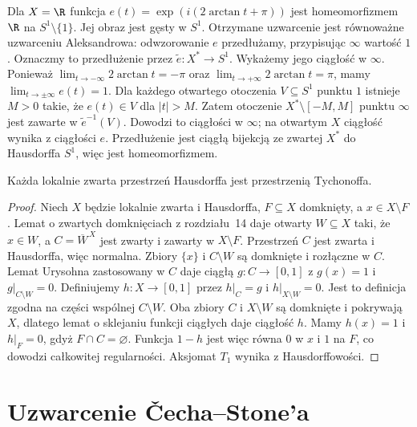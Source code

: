 \begin{przyklad}
\label{ex:topog-uzwarcenia-aleksandrow-prosta}
Dla $X=\R$ funkcja
$e(t)=\exp(i(2\arctan t+\pi))$
jest homeomorfizmem $\R$
na $S^1\setminus\{1\}$.
Jej obraz jest gęsty w $S^1$.
Otrzymane uzwarcenie jest
równoważne uzwarceniu Aleksandrowa:
odwzorowanie $e$ przedłużamy,
przypisując $\infty$ wartość $1$.
Oznaczmy to przedłużenie przez
$\widetilde e\colon X^\ast\to S^1$.
Wykażemy jego ciągłość w $\infty$.
Ponieważ
$\lim_{t\to-\infty}2\arctan t=-\pi$
oraz
$\lim_{t\to+\infty}2\arctan t=\pi$,
mamy
$\lim_{t\to\pm\infty}e(t)=1$.
Dla każdego otwartego otoczenia
$V\subseteq S^1$ punktu $1$
istnieje $M>0$ takie, że
$e(t)\in V$ dla $|t|>M$.
Zatem otoczenie
$X^\ast\setminus[-M,M]$ punktu
$\infty$ jest zawarte w
$\widetilde e^{-1}(V)$.
Dowodzi to ciągłości w $\infty$;
na otwartym $X$ ciągłość
wynika z ciągłości $e$.
Przedłużenie jest ciągłą bijekcją
ze zwartej $X^\ast$ do Hausdorffa $S^1$,
więc jest homeomorfizmem.
\end{przyklad}

\begin{lemat}
\label{lem:topog-uzwarcenia-lokalna-tych}
Każda lokalnie zwarta przestrzeń
Hausdorffa jest przestrzenią Tychonoffa.
\end{lemat}
\begin{proof}
Niech $X$ będzie lokalnie zwarta
i Hausdorffa, $F\subseteq X$ domknięty,
a $x\in X\setminus F$.
Lemat o zwartych domknięciach
z rozdziału~14 daje otwarty
$W\subseteq X$ taki, że
$x\in W$, a
$C=\overline W^{\,X}$ jest zwarty
i zawarty w $X\setminus F$.
Przestrzeń $C$ jest zwarta i Hausdorffa,
więc normalna.
Zbiory $\{x\}$ i $C\setminus W$
są domknięte i rozłączne w $C$.
Lemat Urysohna zastosowany w $C$
daje ciągłą $g\colon C\to[0,1]$
z $g(x)=1$ i $g|_{C\setminus W}=0$.
Definiujemy $h\colon X\to[0,1]$
przez $h|_C=g$ i
$h|_{X\setminus W}=0$.
Jest to definicja zgodna na części
wspólnej $C\setminus W$.
Oba zbiory $C$ i $X\setminus W$
są domknięte i pokrywają $X$,
dlatego lemat o sklejaniu funkcji
ciągłych daje ciągłość $h$.
Mamy $h(x)=1$ i $h|_F=0$,
gdyż $F\cap C=\varnothing$.
Funkcja $1-h$ jest więc równa $0$
w $x$ i $1$ na $F$, co dowodzi
całkowitej regularności.
Aksjomat $T_1$ wynika
z Hausdorffowości.
\end{proof}

\section{Uzwarcenie Čecha--Stone'a}
\label{sec:topog-uzwarcenia-cech-stone}

